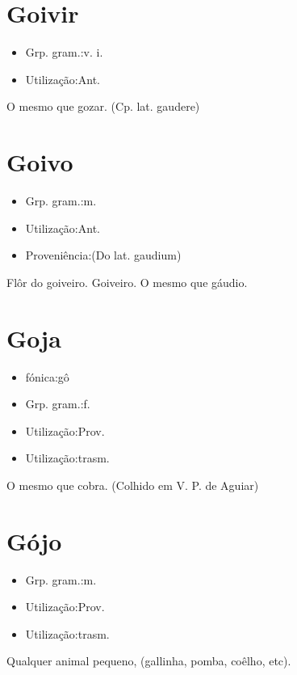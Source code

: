 \section{Goivir}
\begin{itemize}
\item {Grp. gram.:v. i.}
\end{itemize}
\begin{itemize}
\item {Utilização:Ant.}
\end{itemize}
O mesmo que \textunderscore gozar\textunderscore .
(Cp. lat. \textunderscore gaudere\textunderscore )
\section{Goivo}
\begin{itemize}
\item {Grp. gram.:m.}
\end{itemize}
\begin{itemize}
\item {Utilização:Ant.}
\end{itemize}
\begin{itemize}
\item {Proveniência:(Do lat. \textunderscore gaudium\textunderscore )}
\end{itemize}
Flôr do goiveiro.
Goiveiro.
O mesmo que \textunderscore gáudio\textunderscore .
\section{Goja}
\begin{itemize}
\item {fónica:gô}
\end{itemize}
\begin{itemize}
\item {Grp. gram.:f.}
\end{itemize}
\begin{itemize}
\item {Utilização:Prov.}
\end{itemize}
\begin{itemize}
\item {Utilização:trasm.}
\end{itemize}
O mesmo que \textunderscore cobra\textunderscore . (Colhido em V. P. de Aguiar)
\section{Gójo}
\begin{itemize}
\item {Grp. gram.:m.}
\end{itemize}
\begin{itemize}
\item {Utilização:Prov.}
\end{itemize}
\begin{itemize}
\item {Utilização:trasm.}
\end{itemize}
Qualquer animal pequeno, (gallinha, pomba, coêlho, etc).
